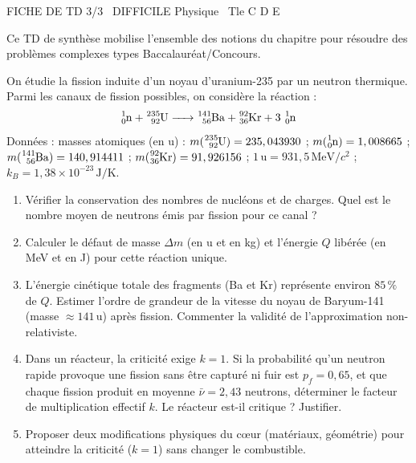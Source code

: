 \documentclass[11pt]{article}
\begin{document}
\begin{tcolorbox}[enhanced,colback=popink,colframe=popink,arc=10pt,boxrule=0pt,left=12pt,right=12pt,top=9pt,bottom=9pt]
{\color{white}\popxbold\small FICHE DE TD 3/3 \textbullet\ DIFFICILE \hfill Physique \textbullet\ Tle C D E\par}
\end{tcolorbox}
\vspace{4pt}
Ce TD de synthèse mobilise l'ensemble des notions du chapitre pour résoudre des problèmes complexes types Baccalauréat/Concours.

\begin{exercice}
On étudie la fission induite d'un noyau d'uranium-235 par un neutron thermique. Parmi les canaux de fission possibles, on considère la réaction :
\[
\ce{^{1}_{0}n + ^{235}_{92}U -> ^{141}_{56}Ba + ^{92}_{36}Kr + 3\,^{1}_{0}n}
\]
Données : masses atomiques (en u) : $m(\ce{^{235}_{92}U}) = 235,043930$ ; $m(\ce{^{1}_{0}n}) = 1,008665$ ; $m(\ce{^{141}_{56}Ba}) = 140,914411$ ; $m(\ce{^{92}_{36}Kr}) = 91,926156$ ; $1\,\text{u} = 931,5\,\text{MeV}/c^2$ ; $k_B = 1,38 \times 10^{-23}\,\text{J/K}$.
\begin{enumerate}
    \item Vérifier la conservation des nombres de nucléons et de charges. Quel est le nombre moyen de neutrons émis par fission pour ce canal ?
    \item Calculer le défaut de masse $\Delta m$ (en u et en kg) et l'énergie $Q$ libérée (en MeV et en J) pour cette réaction unique.
    \item L'énergie cinétique totale des fragments (Ba et Kr) représente environ $85\,\%$ de $Q$. Estimer l'ordre de grandeur de la vitesse du noyau de Baryum-141 (masse $\approx 141\,\text{u}$) après fission. Commenter la validité de l'approximation non-relativiste.
    \item Dans un réacteur, la criticité exige $k = 1$. Si la probabilité qu'un neutron rapide provoque une fission sans être capturé ni fuir est $p_f = 0,65$, et que chaque fission produit en moyenne $\bar{\nu} = 2,43$ neutrons, déterminer le facteur de multiplication effectif $k$. Le réacteur est-il critique ? Justifier.
    \item Proposer deux modifications physiques du cœur (matériaux, géométrie) pour atteindre la criticité ($k=1$) sans changer le combustible.
\end{enumerate}
\end{exercice}
\end{document}
